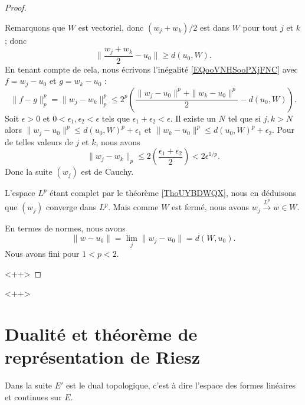 \begin{proof}
\begin{subproof}
            Remarquons que \( W\) est vectoriel, donc \( (w_j+w_k)/2\) est dans \( W\) pour tout \( j\) et \( k\); donc
            \begin{equation}
                \| \frac{ w_j+w_k }{2}-u_0 \|\geq d(u_0,W).
            \end{equation}
            En tenant compte de cela, nous écrivons l'inégalité \eqref{EQooVNHSooPXjFNC} avec \( f=w_j-u_0\) et \( g=w_k-u_0\) :
            \begin{equation}
                \| f-g \|_p^p=\| w_j-w_k \|_p^p\leq 2^p\left( \frac{ \| w_j-u_0 \|^p+\| w_k-u_0 \|^p }{2}-d(u_0,W) \right).
            \end{equation}
            Soit \( \epsilon>0\) et \( 0<\epsilon_1,\epsilon_2<\epsilon\) tels que \( \epsilon_1+\epsilon_2<\epsilon\). Il existe un \( N\) tel que si \( j,k>N\) alors \( \| w_j-u_0 \|^p\leq d(u_0,W)^p+\epsilon_1\) et \( \| w_k-u_0 \|^p\leq d(u_0,W)^p+\epsilon_2\). Pour de telles valeurs de \( j\) et \( k\), nous avons
            \begin{equation}
                \| w_j-w_k \|_p\leq 2\left( \frac{ \epsilon_1+\epsilon_2 }{2} \right)<2\epsilon^{1/p}.
            \end{equation}
            Donc la suite \( (w_j)\) est de Cauchy.

            L'espace \( L^p\) étant complet par le théorème \ref{ThoUYBDWQX}, nous en déduisons que \( (w_j)\) converge dans \( L^p\). Mais comme \( W\) est fermé, nous avons \( w_j\stackrel{L^p}{\longrightarrow}w\in W\).

            En termes de normes, nous avons
            \begin{equation}
                \| w-u_0 \|=\lim_j\| w_j-u_0 \|=d(W,u_0).
            \end{equation}
            Nous avons fini pour \( 1<p<2\).
    \end{subproof}
    <++>
\end{proof}
<++>

\section{Dualité et théorème de représentation de Riesz}

Dans la suite \( E'\) est le dual topologique, c'est à dire l'espace des formes linéaires et continues sur \( E\).

